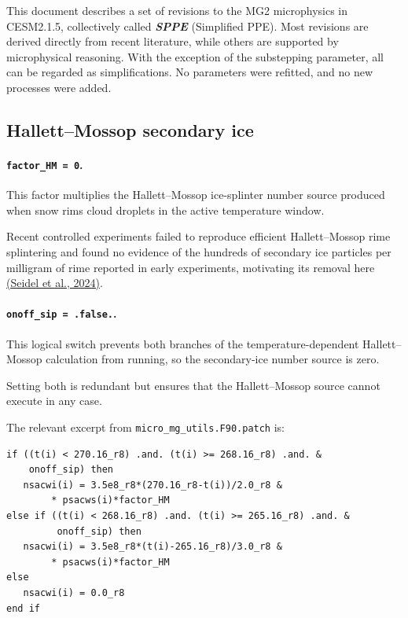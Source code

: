 \providecommand{\sppepatchroot}{../data_code/cesm215/Sppe_patch}

\label{app:sppe-namelist-controls}

This document describes a set of revisions to the MG2 microphysics in CESM2.1.5, collectively called \textbf{\textit{SPPE}} (Simplified PPE). Most revisions are derived directly from recent literature, while others are supported by microphysical reasoning. With the exception of the substepping parameter, all can be regarded as simplifications. No parameters were refitted, and no new processes were added.

\subsection*{Hallett--Mossop secondary ice}

\paragraph*{\texttt{factor\_HM = 0}.}
This factor multiplies the Hallett--Mossop ice-splinter number source produced when snow rims cloud droplets in the active temperature window.

Recent controlled experiments failed to reproduce efficient Hallett--Mossop rime splintering and found no evidence of the hundreds of secondary ice particles per milligram of rime reported in early experiments, motivating its removal here \href{https://doi.org/10.5194/acp-24-5247-2024}{(Seidel et al., 2024)}.

\paragraph*{\texttt{onoff\_sip = .false.}.}
This logical switch prevents both branches of the temperature-dependent Hallett--Mossop calculation from running, so the secondary-ice number source is zero.

Setting both is redundant but ensures that the Hallett--Mossop source cannot execute in any case.

The relevant excerpt from \texttt{micro\_mg\_utils.F90.patch} is:

\begin{verbatim}
if ((t(i) < 270.16_r8) .and. (t(i) >= 268.16_r8) .and. &
    onoff_sip) then
   nsacwi(i) = 3.5e8_r8*(270.16_r8-t(i))/2.0_r8 &
        * psacws(i)*factor_HM
else if ((t(i) < 268.16_r8) .and. (t(i) >= 265.16_r8) .and. &
         onoff_sip) then
   nsacwi(i) = 3.5e8_r8*(t(i)-265.16_r8)/3.0_r8 &
        * psacws(i)*factor_HM
else
   nsacwi(i) = 0.0_r8
end if
\end{verbatim}

